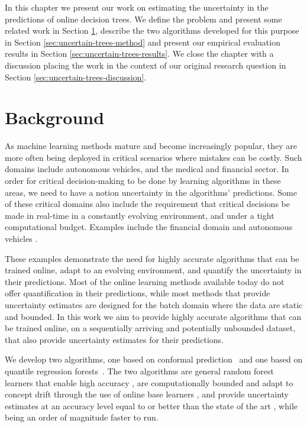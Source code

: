 In this chapter we present our work on estimating the uncertainty
in the predictions of online decision trees. We define the problem
and present some related work in Section \ref{sec:uncertain-trees-background},
describe the two algorithms developed for this purpose in Section
\ref{sec:uncertain-trees-method} and present our empirical evaluation
results in Section \ref{sec:uncertain-trees-results}.
We close the chapter with a discussion placing the work in the
context of our original research question in Section \ref{sec:uncertain-trees-discussion}.

\section{Background}
\label{sec:uncertain-trees-background}

As machine learning methods mature and become increasingly popular, they are more
often being deployed in critical scenarios where mistakes can be costly. Such
domains include autonomous vehicles, and the medical and financial sector.
In order for critical decision-making to be done by learning algorithms in these areas, we need
to have a notion uncertainty in the algorithms' predictions.
Some of these critical domains also include the requirement that critical decisions
be made in real-time in a constantly evolving environment, and under a tight computational budget. Examples include the financial domain \cite{streaming-finance} and autonomous vehicles \cite{av-safety}.

These examples demonstrate the need for highly accurate algorithms that can be trained
online, adapt to an evolving environment, and quantify the uncertainty in their
predictions. Most of the online learning methods available today do not offer
quantification in their predictions, while most methods that provide uncertainty
estimates are designed for the batch domain where the data are static and bounded.
In this work we aim to provide highly accurate algorithms that can be trained
online, on a sequentially arriving and potentially unbounded dataset, that also
provide uncertainty estimates for their predictions.

We develop two algorithms, one based on conformal prediction~\cite{vovk2005algorithmic} and one based on quantile
regression forests~\cite{meinshausen2006quantile}. The two algorithms are general random forest learners that
enable high accuracy \cite{hundreds-classifiers}, are computationally bounded
and adapt to concept drift through the use of online base learners \cite{fimt},
and provide uncertainty estimates at an accuracy level equal to or better
than the state of the art \cite{mondrian-forests-original}, while being an order of magnitude faster to run.

